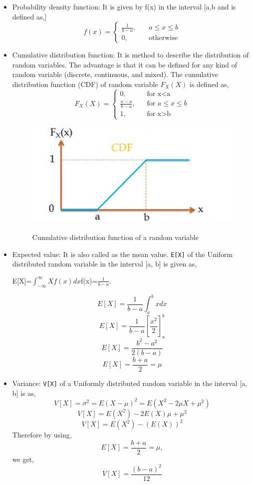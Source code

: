 \begin{itemize}
\item Probability density function: It is given by f(x) in the interval [a,b and is defined as,]\\
\[f(x)=
	\begin{cases}
		\text{$\frac{1}{b-a},$} &\quad\text{$a \leq x \leq b$}\\
		\text{0,} &\quad\text{otherwise}
		\end{cases}
\] 

\item Cumulative distribution function: It is method to describe the distribution of random variables. The advantage is that it can be defined for any kind of random variable (discrete, continuous, and mixed). 
The cumulative distribution function (CDF) of random variable $F_X(X)$ is defined as,
 \[F_X(X)=
	\begin{cases}
		\text{0,} &\quad\text{for x$<$a} \\
		\text{$\frac{x-a}{b-a}$,} &\quad\text{for $a \leq x \leq b$}\\		\text{1,} &\quad\text{for x$>$b}
		\end{cases}
\] 
\begin{figure}[H]
\begin{center}
\includegraphics[scale=1.1]{fig11.png}\\
\caption{Cumulative distribution function of a random variable}
\label{Cumulative distribution function of a random variable}
\end{center}
\end{figure}

\item Expected value: It is also called as the mean value. \texttt{E[X]} of the Uniform distributed random variable in the interval [a, b] is given as,\\
\begin{center}E[X]=$\int_{-\infty}^{\infty}Xf(x)dx$\space\space\space\space\space f(x)=$\frac{1}{b-a}$.\end{center}
$$E[X]=\frac{1}{b-a}\int_a^bxdx$$
$$E[X]=\frac{1}{b-a}\left[\frac{x^2}{2}\right]_a^b$$
$$E[X]=\frac{b^2-a^2}{2(b-a)}$$
$$E[X]=\frac{b+a}{2} = \mu $$

\item Variance: \texttt{V[X]} of a Uniformly distributed random variable in the interval [a, b] is as,\\
$$V[X]=\sigma^2=E(X-\mu)^2=E(X^2-2\mu X+\mu^2)$$
$$V[X]=E(X^2)-2E(X)\mu+\mu^2$$
$$V[X]=E(X^2)-(E(X))^2$$
\noindent Therefore by using, $$E[X]=\frac{b+a}{2} = \mu,$$
\noindent we get,
$$V[X] = \frac{(b-a)^2}{12}$$

\end{itemize}
